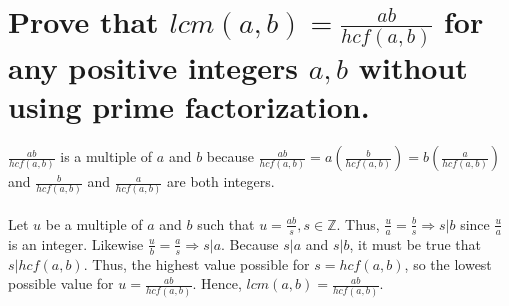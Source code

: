 \documentclass[12pt]{article}
\begin{document}
\section{
    Prove that $lcm(a,b) = \frac{ab}{hcf(a,b)}$ for any positive integers $a,b$ without using prime factorization.
}
$\frac{ab}{hcf(a,b)}$ is a multiple of $a$ and $b$ because $\frac{ab}{hcf(a,b)} = a(\frac{b}{hcf(a,b)}) = b(\frac{a}{hcf(a,b)})$
and $\frac{b}{hcf(a,b)}$ and $\frac{a}{hcf(a,b)}$ are both integers.\\\\
Let $u$ be a multiple of $a$ and $b$ such that $u = \frac{ab}{s}, s \in \mathds{Z}$.
Thus, $\frac{u}{a} = \frac{b}{s} \Rightarrow s|b$ since $\frac{u}{a}$ is an integer.
Likewise $\frac{u}{b} = \frac{a}{s} \Rightarrow s|a$. Because $s|a$ and $s|b$, it must be true that $s|hcf(a,b)$.
Thus, the highest value possible for $s = hcf(a,b)$, so the lowest possible value for $u = \frac{ab}{hcf(a,b)}$.
Hence, $lcm(a,b) = \frac{ab}{hcf(a,b)}$.
\end{document}
